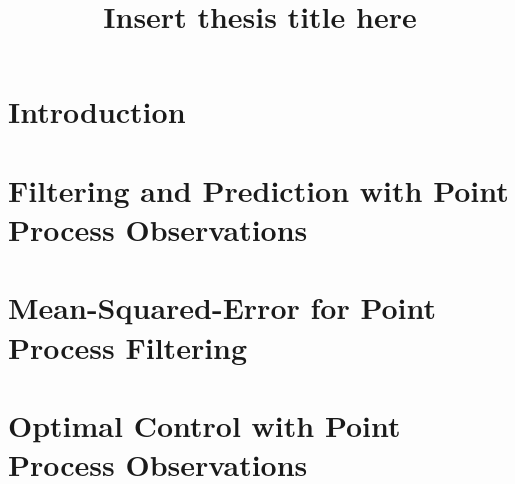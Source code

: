 \documentclass[phd, titlesmallcaps, examinerscopy, copyrightpage, foronline]{mqthesis_v23/mqthesis}
\begin{document}
\frontmatter

\title{Insert thesis title here}





\titlepage

\tableofcontents
\listoffigures
\listoftables

\mainmatter

\chapter{Introduction}

\label{chap:intro}



\chapter{Filtering and Prediction with Point Process Observations}

\label{chap:filtering}



\chapter{Mean-Squared-Error for Point Process Filtering}

\label{chap:mse}



\chapter{Optimal Control with Point Process Observations}

\label{chap:control}


\end{document}
